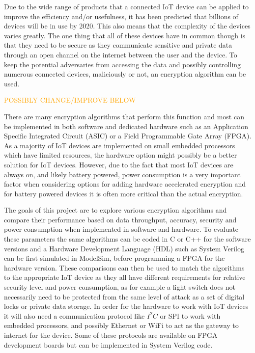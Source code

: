 \documentclass[12pt,twoside,a4paper]{report}
\begin{document}
    Due to the wide range of products that a connected IoT device can be applied to improve the efficiency and/or usefulness, it has been predicted that billions of devices will be in use by 2020\cite{Evans2011}. This also means that the complexity of the devices varies greatly. The one thing that all of these devices have in common though is that they need to be secure as they communicate sensitive and private data through an open channel on the internet between the user and the device. To keep the potential adversaries from accessing the data and possibly controlling numerous connected devices, maliciously or not, an encryption algorithm can be used.
    
    \textcolor{orange}{POSSIBLY CHANGE/IMPROVE BELOW}      
        
    There are many encryption algorithms that perform this function and most can be implemented in both software and dedicated hardware such as an Application Specific Integrated Circuit (ASIC) or a Field Programmable Gate Array (FPGA). As a majority of IoT devices are implemented on small embedded processors which have limited resources, the hardware option might possibly be a better solution for IoT devices. However, due to the fact that most IoT devices are always on, and likely battery powered, power consumption is a very important factor when considering options for adding hardware accelerated encryption and for battery powered devices it is often more critical than the actual encryption.
    
    The goals of this project are to explore various encryption algorithms and compare their performance based on data throughput, accuracy, security and power consumption when implemented in software and hardware. To evaluate these parameters the same algorithms can be coded in C or C++ for the software versions and a Hardware Development Language (HDL) such as System Verilog can be first simulated in ModelSim, before programming a FPGA for the hardware version. These comparisons can then be used to match the algorithms to the appropriate IoT device as they all have different requirements for relative security level and power consumption, as for example a light switch does not necessarily need to be protected from the same level of attack as a set of digital locks or private data storage. In order for the hardware to work with IoT devices it will also need a communication protocol like $I^2 C$ or SPI to work with embedded processors, and possibly Ethernet or WiFi to act as the gateway to internet for the device. Some of these protocols are available on FPGA development boards but can be implemented in System Verilog code.
    
\end{document}

